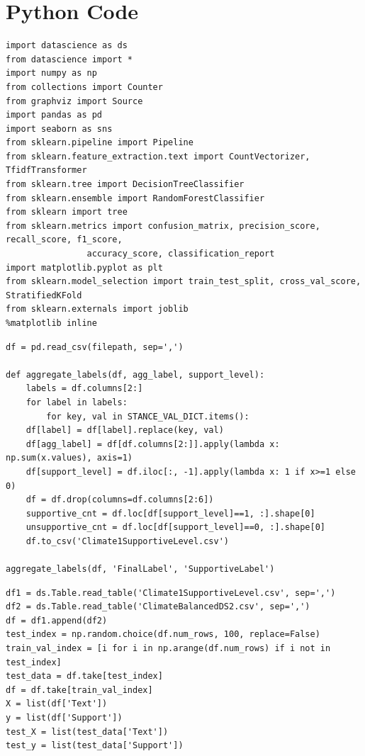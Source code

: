 \documentclass{article} %
\begin{document}
\section{Python Code}

\lstset{language=Python}
\lstset{frame=lines}
\lstset{basicstyle=\footnotesize}
\begin{lstlisting}
import datascience as ds
from datascience import *
import numpy as np
from collections import Counter
from graphviz import Source
import pandas as pd
import seaborn as sns
from sklearn.pipeline import Pipeline
from sklearn.feature_extraction.text import CountVectorizer, TfidfTransformer
from sklearn.tree import DecisionTreeClassifier
from sklearn.ensemble import RandomForestClassifier
from sklearn import tree
from sklearn.metrics import confusion_matrix, precision_score, recall_score, f1_score, 
			    accuracy_score, classification_report
import matplotlib.pyplot as plt
from sklearn.model_selection import train_test_split, cross_val_score, StratifiedKFold
from sklearn.externals import joblib
%matplotlib inline
\end{lstlisting}


\lstset{language=Python}
\lstset{frame=lines}
\lstset{basicstyle=\footnotesize}
\begin{lstlisting}
df = pd.read_csv(filepath, sep=',')

def aggregate_labels(df, agg_label, support_level):
	labels = df.columns[2:]
	for label in labels:
		for key, val in STANCE_VAL_DICT.items():
	df[label] = df[label].replace(key, val)
	df[agg_label] = df[df.columns[2:]].apply(lambda x: np.sum(x.values), axis=1)
	df[support_level] = df.iloc[:, -1].apply(lambda x: 1 if x>=1 else 0)
	df = df.drop(columns=df.columns[2:6])
	supportive_cnt = df.loc[df[support_level]==1, :].shape[0]
	unsupportive_cnt = df.loc[df[support_level]==0, :].shape[0]
	df.to_csv('Climate1SupportiveLevel.csv')

aggregate_labels(df, 'FinalLabel', 'SupportiveLabel')
\end{lstlisting}


\lstset{language=Python}
\lstset{frame=lines}
\lstset{basicstyle=\footnotesize}
\begin{lstlisting}
df1 = ds.Table.read_table('Climate1SupportiveLevel.csv', sep=',')
df2 = ds.Table.read_table('ClimateBalancedDS2.csv', sep=',')
df = df1.append(df2)
test_index = np.random.choice(df.num_rows, 100, replace=False)
train_val_index = [i for i in np.arange(df.num_rows) if i not in test_index]
test_data = df.take[test_index]
df = df.take[train_val_index]
X = list(df['Text'])
y = list(df['Support'])
test_X = list(test_data['Text'])
test_y = list(test_data['Support'])
\end{lstlisting}
\end{document}
